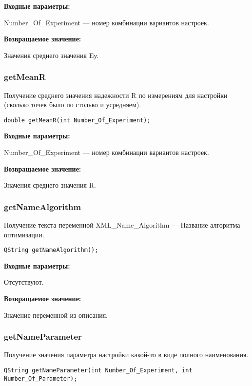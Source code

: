 \textbf{Входные параметры:}

Number\_Of\_Experiment --- номер комбинации вариантов настроек.

\textbf{Возвращаемое значение:}

Значения среднего значения Ey.


\subsubsection{getMeanR}\label{getMeanR}

Получение среднего значения надежности R по измерениям для настройки (сколько точек было по столько и усредняем).


\begin{lstlisting}[label=code_syntax_getMeanR,caption=Синтаксис]
double getMeanR(int Number_Of_Experiment);
\end{lstlisting}

\textbf{Входные параметры:}

Number\_Of\_Experiment --- номер комбинации вариантов настроек.

\textbf{Возвращаемое значение:}

Значения среднего значения R.


\subsubsection{getNameAlgorithm}\label{getNameAlgorithm}

Получение текста переменной  XML\_Name\_Algorithm --- Название алгоритма оптимизации.


\begin{lstlisting}[label=code_syntax_getNameAlgorithm,caption=Синтаксис]
QString getNameAlgorithm();
\end{lstlisting}

\textbf{Входные параметры:}

Отсутствуют.

\textbf{Возвращаемое значение:}

Значение переменной из описания.


\subsubsection{getNameParameter}\label{getNameParameter}

Получение значения параметра настройки какой-то в виде полного наименования.


\begin{lstlisting}[label=code_syntax_getNameParameter,caption=Синтаксис]
QString getNameParameter(int Number_Of_Experiment, int Number_Of_Parameter);
\end{lstlisting}

